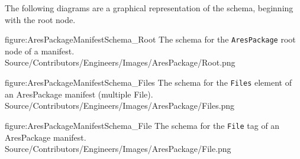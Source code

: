 The following diagrams are a graphical representation of the schema, beginning with the root node.

\FullPageDiagram
    {figure:AresPackageManifestSchema_Root}
    {The schema for the {\tt AresPackage} root node of a manifest.}
    {Source/Contributors/Engineers/Images/AresPackage/Root.png}

\FullPageDiagram
    {figure:AresPackageManifestSchema_Files}
    {The schema for the {\tt Files} element of an AresPackage manifest (multiple File).}
    {Source/Contributors/Engineers/Images/AresPackage/Files.png}

\FullPageDiagram
    {figure:AresPackageManifestSchema_File}
    {The schema for the {\tt File} tag of an AresPackage manifest.}
    {Source/Contributors/Engineers/Images/AresPackage/File.png}


